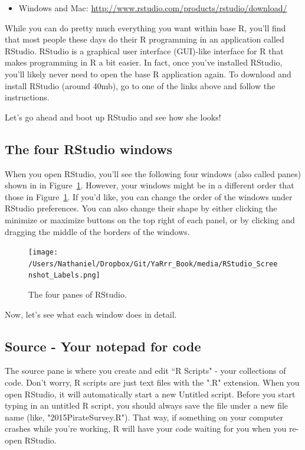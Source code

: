 \documentclass{tufte-book}\usepackage[]{graphicx}\usepackage[]{color}
\begin{document}
\begin{itemize}

\item Windows and Mac: \textcolor{blue}{\href{<http://www.rstudio.com/products/rstudio/download/>}{http://www.rstudio.com/products/rstudio/download/}}

\end{itemize}

While you can do pretty much everything you want within base R, you'll find that most people these days do their R programming in an application called RStudio. RStudio is a graphical user interface (GUI)-like interface for R that makes programming in R a bit easier. In fact, once you've installed RStudio, you'll likely never need to open the base R application again. To download and install RStudio (around 40mb), go to one of the links above and follow the instructions.


Let's go ahead and boot up RStudio and see how she looks!

\subsection{The four RStudio windows}

When you open RStudio, you'll see the following four windows (also called panes) shown in in Figure~\ref{fig:rstudioscreen}. However, your windows might be in a different order that those in Figure~\ref{fig:rstudioscreen}. If you'd like, you can change the order of the windows under RStudio preferences. You can also change their shape by either clicking the minimize or maximize buttons on the top right of each panel, or by clicking and dragging the middle of the borders of the windows.

\begin{figure}[h]
\texttt{[image: /Users/Nathaniel/Dropbox/Git/YaRrr\_Book/media/RStudio\_Screenshot\_Labels.png]}
\caption{The four panes of RStudio.}
\label{fig:rstudioscreen}
\end{figure}


Now, let's see what each window does in detail.

\subsection{Source - Your notepad for code}

The source pane is where you create and edit ``R Scripts" - your collections of code. Don't worry, R scripts are just text files with the ".R" extension. When you open RStudio, it will automatically start a new Untitled script. Before you start typing in an untitled R script, you should always save the file under a new file name (like, "2015PirateSurvey.R"). That way, if something on your computer crashes while you're working, R will have your code waiting for you when you re-open RStudio.
\end{document}

